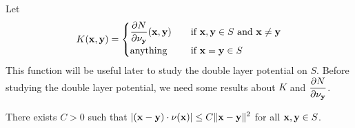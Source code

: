 Let
\begin{equation} \label{pot_K_defn}
K(\mathbf{x},\mathbf{y}) =
\begin{cases}
\displaystyle \frac{\partial{N}}{\partial \mathbf{\nu}_{\mathbf{y}}}(\mathbf{x},\mathbf{y}) &
\quad \text{if} \ \mathbf{x},\mathbf{y} \in S \ \text{and} \ \mathbf{x} \neq \mathbf{y} \\
\text{anything} & \quad \text{if} \ \mathbf{x}=\mathbf{y} \in S
\end{cases}
\end{equation}
This function will be useful later to study the double layer
potential on $S$.  Before studying the double layer potential, we need
some results about $K$ and $\displaystyle \frac{\partial{N}}{\partial \mathbf{\nu}_{\mathbf{y}}}$.

\begin{lemma} \label{pot_lem_dbl1}
There exists $C>0$ such that
$\displaystyle \left| (\mathbf{x}-\mathbf{y}) \cdot \mathbf{\nu}(\mathbf{x}) \right| \leq C
\|\mathbf{x}-\mathbf{y}\|^2$ for all $\mathbf{x},\mathbf{y} \in S$.
\end{lemma}

